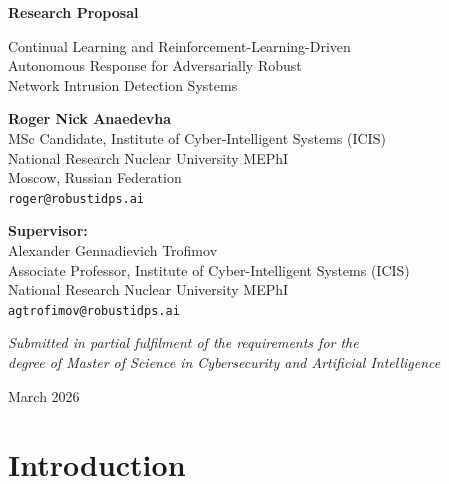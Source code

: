 \documentclass[12pt,a4paper]{article}
\theoremstyle{definition}
\begin{document}
\begin{titlepage}
\begin{center}
\vspace*{2cm}

{\LARGE\bfseries Research Proposal}

\vspace{0.8cm}

{\Large Continual Learning and Reinforcement-Learning-Driven\\[4pt]
Autonomous Response for Adversarially Robust\\[4pt]
Network Intrusion Detection Systems}

\vspace{1.5cm}

{\large\textbf{Roger Nick Anaedevha}}\\[4pt]
{\normalsize MSc Candidate, Institute of Cyber-Intelligent Systems (ICIS)\\
National Research Nuclear University MEPhI\\
Moscow, Russian Federation\\
\texttt{roger@robustidps.ai}}

\vspace{1cm}

{\large\textbf{Supervisor:}}\\[4pt]
{\large Alexander Gennadievich Trofimov}\\[4pt]
{\normalsize Associate Professor, Institute of Cyber-Intelligent Systems (ICIS)\\
National Research Nuclear University MEPhI\\
\texttt{agtrofimov@robustidps.ai}}

\vspace{2cm}

{\normalsize\textit{Submitted in partial fulfilment of the requirements for the\\
degree of Master of Science in Cybersecurity and Artificial Intelligence}}

\vspace{1.5cm}
{\normalsize March 2026}
\end{center}
\end{titlepage}

\tableofcontents
\newpage

\section{Introduction}
\label{sec:intro}
\end{document}
